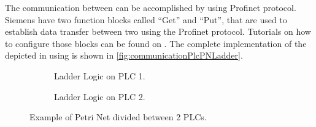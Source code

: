 The communication between \PLCs{} can be accomplished by using Profinet
protocol. Siemens \PLCs{} have two function blocks called ``Get'' and
``Put'', that are used to establish data transfer between two \PLCs{} using the
Profinet protocol. Tutorials on how to configure those blocks can be found on \citep{antunesfloriano2019sincronizacao,oliveira2016protocolo,rochapereira2019automacao}.
The complete implementation of the \CIPN{} depicted in
 using \LD{} is shown in \autoref{fig:communicationPlcPNLadder}.

  \begin{figure}[H]
    \centering
    \begin{subfigure}[t]{\textwidth}
      \begin{minipage}[b]{0.45\linewidth}
        \centering
      \end{minipage}
      \hspace{0.5cm}
      \begin{minipage}[b]{0.45\linewidth}
        \centering
      \end{minipage}
      \caption{Ladder Logic on PLC 1.}
      \label{fig:communicationPlcPN1Ladder}
    \end{subfigure}%
    \hfill
    \begin{subfigure}[t]{\textwidth}
      \begin{minipage}[b]{0.45\linewidth}
        \centering
      \end{minipage}
      \hspace{0.5cm}
      \begin{minipage}[b]{0.45\linewidth}
        \centering
      \end{minipage}
      \caption{Ladder Logic on PLC 2.}
      \label{fig:communicationPlcPN2Ladder}
    \end{subfigure}
    \caption{Example of Petri Net divided between 2 PLCs.}
    \label{fig:communicationPlcPNLadder}
  \end{figure}


